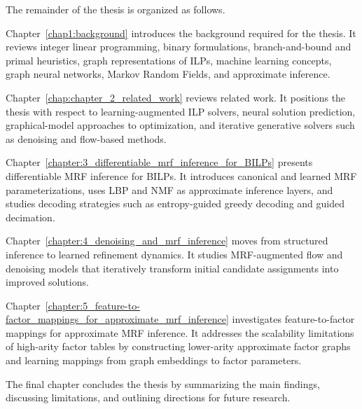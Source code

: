 The remainder of the thesis is organized as follows.

Chapter~\ref{chap1:background} introduces the background required for the thesis. It reviews integer linear programming, binary formulations, branch-and-bound and primal heuristics, graph representations of ILPs, machine learning concepts, graph neural networks, Markov Random Fields, and approximate inference.

Chapter~\ref{chap:chapter_2_related_work} reviews related work. It positions the thesis with respect to learning-augmented ILP solvers, neural solution prediction, graphical-model approaches to optimization, and iterative generative solvers such as denoising and flow-based methods.

Chapter~\ref{chapter:3_differentiable_mrf_inference_for_BILPs} presents differentiable MRF inference for BILPs. It introduces canonical and learned MRF parameterizations, uses LBP and NMF as approximate inference layers, and studies decoding strategies such as entropy-guided greedy decoding and guided decimation.

Chapter~\ref{chapter:4_denoising_and_mrf_inference} moves from structured inference to learned refinement dynamics. It studies MRF-augmented flow and denoising models that iteratively transform initial candidate assignments into improved solutions.

Chapter~\ref{chapter:5_feature-to-factor_mappings_for_approximate_mrf_inference} investigates feature-to-factor mappings for approximate MRF inference. It addresses the scalability limitations of high-arity factor tables by constructing lower-arity approximate factor graphs and learning mappings from graph embeddings to factor parameters.

The final chapter concludes the thesis by summarizing the main findings, discussing limitations, and outlining directions for future research.
